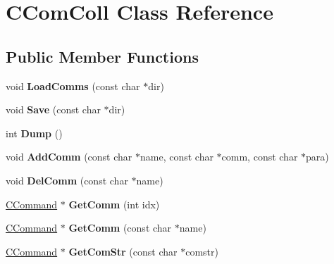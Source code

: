 \hypertarget{class_c_com_coll}{\section{C\-Com\-Coll Class Reference}
\label{class_c_com_coll}
}
\subsection*{Public Member Functions}
\begin{DoxyCompactItemize}
\item 
\hypertarget{class_c_com_coll_a5d13ddb837b38419829dcccc6694ccdc}{void {\bfseries Load\-Comms} (const char $\ast$dir)}\label{class_c_com_coll_a5d13ddb837b38419829dcccc6694ccdc}

\item 
\hypertarget{class_c_com_coll_a9863d38bd2b83d0ae2b8f0df5f0da82d}{void {\bfseries Save} (const char $\ast$dir)}\label{class_c_com_coll_a9863d38bd2b83d0ae2b8f0df5f0da82d}

\item 
\hypertarget{class_c_com_coll_abac472b6d4a1949ec77dd40d61b46228}{int {\bfseries Dump} ()}\label{class_c_com_coll_abac472b6d4a1949ec77dd40d61b46228}

\item 
\hypertarget{class_c_com_coll_a8d70e15dafe142cd8bf0b86b43d61907}{void {\bfseries Add\-Comm} (const char $\ast$name, const char $\ast$comm, const char $\ast$para)}\label{class_c_com_coll_a8d70e15dafe142cd8bf0b86b43d61907}

\item 
\hypertarget{class_c_com_coll_ae40487809c5a0ec349ee95eaef4719d6}{void {\bfseries Del\-Comm} (const char $\ast$name)}\label{class_c_com_coll_ae40487809c5a0ec349ee95eaef4719d6}

\item 
\hypertarget{class_c_com_coll_a5949eed35b394a5cd279747d83820521}{\hyperlink{class_c_command}{C\-Command} $\ast$ {\bfseries Get\-Comm} (int idx)}\label{class_c_com_coll_a5949eed35b394a5cd279747d83820521}

\item 
\hypertarget{class_c_com_coll_a89bbadaea1fdb8af2cbac8288b33ee5d}{\hyperlink{class_c_command}{C\-Command} $\ast$ {\bfseries Get\-Comm} (const char $\ast$name)}\label{class_c_com_coll_a89bbadaea1fdb8af2cbac8288b33ee5d}

\item 
\hypertarget{class_c_com_coll_a54a3f13fe4979acbd23a21f4bf838556}{\hyperlink{class_c_command}{C\-Command} $\ast$ {\bfseries Get\-Com\-Str} (const char $\ast$comstr)}\label{class_c_com_coll_a54a3f13fe4979acbd23a21f4bf838556}

\end{DoxyCompactItemize}
